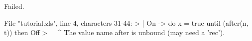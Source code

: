 \runverbatimfalse
{}
\begin{RunVerbatimMsg}
Failed.
\end{RunVerbatimMsg}
\begin{RunVerbatimErr}
File "tutorial.zls", line 4, characters 31-44:
>   | On  -> do x = true  until (after(n, t)) then Off
>                               ^^^^^^^^^^^^^
The value name after is unbound (may need a 'rec').
\end{RunVerbatimErr}
